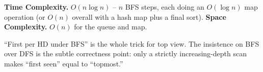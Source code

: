 \begin{complexitybox}
\textbf{Time Complexity.} $O(n\log n)$ -- $n$ BFS steps, each doing an
$O(\log n)$ map operation (or $O(n)$ overall with a hash map plus a final
sort). \textbf{Space Complexity.} $O(n)$ for the queue and map.
\end{complexitybox}

\begin{takeawaybox}
``First per HD under BFS'' is the whole trick for top view. The insistence
on BFS over DFS is the subtle correctness point: only a strictly
increasing-depth scan makes ``first seen'' equal to ``topmost.''
\end{takeawaybox}
